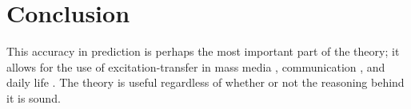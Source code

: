 \documentclass[
  stu]{apa7}
\begin{document}
\hypertarget{conclusion}{%
\section{Conclusion}\label{conclusion}}

This accuracy in prediction is perhaps the most important part of the
theory; it allows for the use of excitation-transfer in mass media
\autocite{bryExcitationTransferTheoryThreeFactor,tanEmotionalArousalFacilitation},
communication \autocite{zilEffectResidualExcitation}, and daily life
\autocite{tanEmotionalArousalFacilitation}. The theory is useful
regardless of whether or not the reasoning behind it is sound.

\printbibliography
\end{document}
